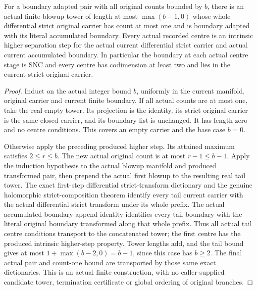 \begin{theorem}
\label{hir:general-nc-bounded-actual-separation-tower}
\leanok
{}
For a boundary adapted pair with all original counts bounded by $b$,
there is an actual finite blowup tower of length at most
$\max(b-1,0)$ whose whole differential strict original carrier has
count at most one and is boundary adapted with its literal accumulated
boundary. Every actual recorded centre is an intrinsic higher
separation step for the actual current differential strict carrier
and actual current accumulated boundary. In particular the boundary
at each actual centre stage is SNC and every centre has codimension
at least two and lies in the current strict original carrier.
\end{theorem}
\begin{proof}
Induct on the actual integer bound $b$, uniformly in the current
manifold, original carrier and current finite boundary. If all actual
counts are at most one, take the real empty tower. Its projection is
the identity, its strict original carrier is the same closed carrier,
and its boundary list is unchanged. It has length zero and no centre
conditions. This covers an empty carrier and the base case $b=0$.

Otherwise apply the preceding produced higher step. Its attained
maximum satisfies $2\le r\le b$. The new actual original count is
at most $r-1\le b-1$. Apply the induction hypothesis to the actual
blowup manifold and produced transformed pair, then prepend the
actual first blowup to the resulting real tail tower. The exact
first-step differential strict-transform dictionary and the genuine
holomorphic strict-composition theorem identify every tail current
carrier with the actual differential strict transform under its
whole prefix. The actual accumulated-boundary append identity
identifies every tail boundary with the literal original boundary
transformed along that whole prefix. Thus all actual tail centre
conditions transport to the concatenated tower; the first centre
has the produced intrinsic higher-step property. Tower lengths add,
and the tail bound gives at most $1+\max(b-2,0)=b-1$, since this
case has $b\ge2$. The final actual pair and count-one bound are
transported by those same exact dictionaries. This is an actual
finite construction, with no caller-supplied candidate tower,
termination certificate or global ordering of original branches.
\end{proof}

